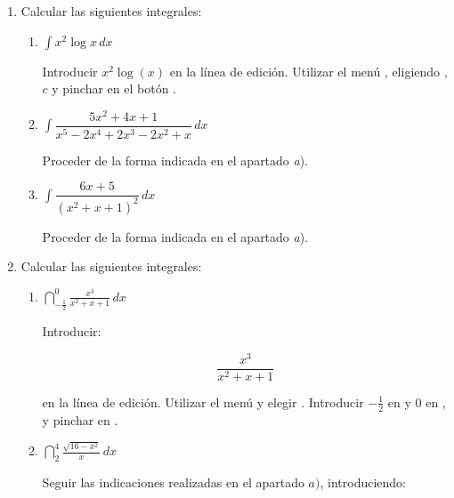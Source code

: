 \begin{enumerate}[leftmargin=*]
\item Calcular las siguientes integrales:
\begin{enumerate}

\item $ \int{x^{2} \log{x}\,dx}$

\begin{indicacion}
{Introducir $x^{2}\log(x)$ en la línea de edición. Utilizar el menú
, eligiendo ,
 $c$ y pinchar en el botón . }
\end{indicacion}

\item $ \int{\dfrac{5x^{2}+4x+1}{x^{5}-2x^{4}+2x^{3}-2x^{2}+x}\,dx}$
\begin{indicacion}
{Proceder de la forma indicada en el apartado \emph{a}). }
\end{indicacion}

\item $ \int{\dfrac{6x+5}{(x^{2}+x+1)^{2}}\,dx}$
\begin{indicacion}
{Proceder de la forma indicada en el apartado \emph{a}). }
\end{indicacion}

\end{enumerate}

\item Calcular las siguientes integrales:

\begin{enumerate}

\item $ \dint^{0}_{-\frac{1}{2}}{\frac{x^{3}}{x^{2}+x+1}}\,dx$

\begin{indicacion}
{Introducir:

\[
\frac{x^{3}}{x^{2}+x+1}
\]

en la línea de edición. Utilizar el menú 
y elegir . Introducir $-\frac{1}{2}$ en
 y 0 en , y pinchar
en . }
\end{indicacion}

\item $ \dint^{4}_{2}{\frac{\sqrt{16-x^{2}}}{x}\,dx}$

\begin{indicacion}
{Seguir las indicaciones realizadas en el apartado $a)$,
introduciendo:

}
\end{indicacion}
\end{enumerate}
\end{enumerate}
